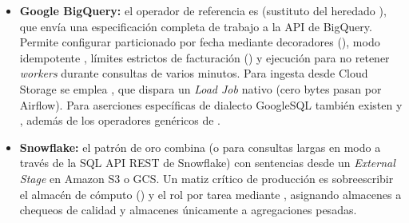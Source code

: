 \begin{itemize}
  \item \textbf{Google BigQuery:} el operador de referencia es  (sustituto del heredado ), que envía una especificación completa de trabajo a la API de BigQuery. Permite configurar particionado por fecha mediante decoradores (), modo idempotente , límites estrictos de facturación () y ejecución  para no retener \textit{workers} durante consultas de varios minutos. Para ingesta desde Cloud Storage se emplea , que dispara un \textit{Load Job} nativo (cero bytes pasan por Airflow). Para aserciones específicas de dialecto GoogleSQL también existen  y , además de los operadores genéricos de .
  \item \textbf{Snowflake:} el patrón de oro combina  (o  para consultas largas en modo  a través de la SQL API REST de Snowflake) con sentencias  desde un \textit{External Stage} en Amazon S3 o GCS. Un matiz crítico de producción es sobreescribir el almacén de cómputo () y el rol por tarea mediante , asignando almacenes  a chequeos de calidad y almacenes  únicamente a agregaciones pesadas.
\end{itemize}

